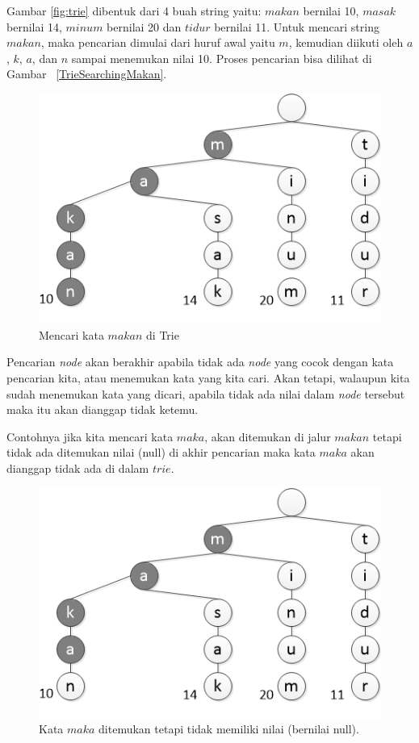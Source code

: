 Gambar \ref{fig:trie} dibentuk dari 4 buah string yaitu: $makan$ bernilai 10, $masak$ bernilai 14, $minum$ bernilai 20 dan $tidur$ bernilai 11. Untuk mencari string $makan$, maka pencarian dimulai dari huruf awal yaitu $m$, kemudian diikuti oleh $a$, $k$, $a$, dan $n$ sampai menemukan nilai 10. Proses pencarian bisa dilihat di Gambar ~\ref{TrieSearchingMakan}.

\begin{figure}
    \includegraphics[width=\textwidth,keepaspectratio]{fig/TrieSearchingMakan.png}%
	\caption{Mencari kata $makan$ di Trie}%
	\label{fig:TrieSearchingMakan}%
\end{figure}

Pencarian \textit{node} akan berakhir apabila tidak ada \textit{node} yang cocok dengan kata pencarian kita, atau menemukan kata yang kita cari. Akan tetapi, walaupun kita sudah menemukan kata yang dicari, apabila tidak ada nilai dalam \textit{node} tersebut maka itu akan dianggap tidak ketemu. 

Contohnya jika kita mencari kata $maka$, akan ditemukan di jalur $makan$ tetapi tidak ada ditemukan nilai (null) di akhir pencarian maka kata $maka$ akan dianggap tidak ada di dalam $trie$.

\begin{figure}
    \includegraphics[width=\textwidth,keepaspectratio]{fig/TrieSearchingMaka.png}%
	\caption{Kata $maka$ ditemukan tetapi tidak memiliki nilai (bernilai null).}%
	\label{fig:TrieSearchingMaka}%
\end{figure}


